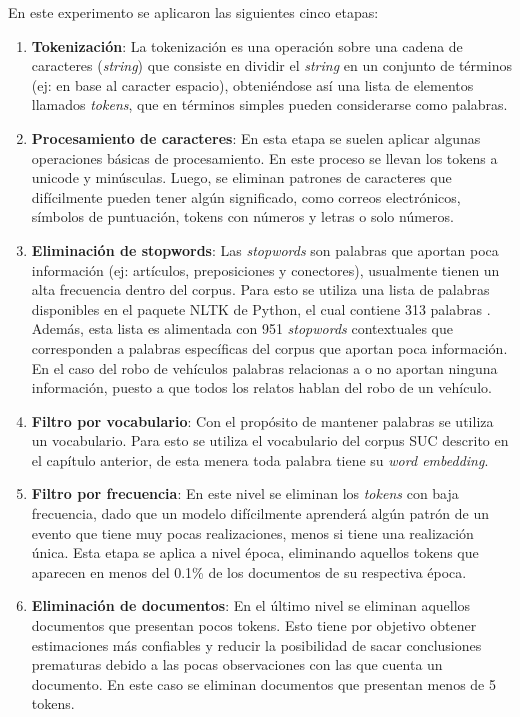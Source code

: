 En este experimento se aplicaron las siguientes cinco etapas:
\begin{enumerate}
  \item \textbf{Tokenización}: La tokenización es una operación sobre una cadena de caracteres (\textit{string}) que consiste en dividir el \textit{string} en un conjunto de términos (ej: en base al caracter espacio), obteniéndose así una lista de elementos llamados \textit{tokens}, que en términos simples pueden considerarse como palabras.
\item \textbf{Procesamiento de caracteres}: En esta etapa se suelen aplicar algunas operaciones básicas de procesamiento. En este proceso se llevan los tokens a unicode y minúsculas. Luego, se eliminan patrones de caracteres que difícilmente pueden tener algún significado, como correos electrónicos, símbolos de puntuación, tokens con números y letras o solo números. 
\item \textbf{Eliminación de stopwords}: Las \textit{stopwords} \citep{wilbur1992automatic} son palabras que aportan poca información (ej: artículos, preposiciones y conectores), usualmente tienen un alta frecuencia dentro del corpus. Para esto se utiliza una lista de palabras disponibles en el paquete NLTK de Python, el cual contiene 313 palabras \citep{bird2009natural}. Además, esta lista es alimentada con 951 \textit{stopwords} contextuales que corresponden a palabras específicas del corpus que aportan poca información. En el caso del robo de vehículos palabras relacionas a  o  no aportan ninguna información, puesto a que todos los relatos hablan del robo de un vehículo. 
\item \textbf{Filtro por vocabulario}: Con el propósito de mantener palabras  se utiliza un vocabulario. Para esto se utiliza el vocabulario del corpus SUC descrito en el capítulo anterior, de esta menera toda palabra tiene su \textit{word embedding}. 
\item \textbf{Filtro por frecuencia}: En este nivel se eliminan los \textit{tokens} con baja frecuencia, dado que un modelo difícilmente aprenderá algún patrón de un evento que tiene muy pocas realizaciones, menos si tiene una realización única. Esta etapa se aplica a nivel época, eliminando aquellos tokens que aparecen en menos del 0.1\% de los documentos de su respectiva época.
\item \textbf{Eliminación de documentos}: En el último nivel se eliminan aquellos documentos que presentan pocos tokens. Esto tiene por objetivo obtener estimaciones más confiables y reducir la posibilidad de sacar conclusiones prematuras debido a las pocas observaciones con las que cuenta un documento. En este caso se eliminan documentos que presentan menos de 5 tokens.
\end{enumerate}

